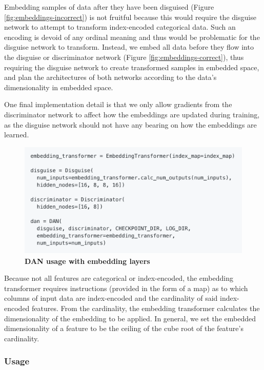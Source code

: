 \documentclass{proc}
\begin{document}
Embedding samples of data after they have been disguised (Figure \ref{fig:embeddings-incorrect}) is not fruitful because this would require the disguise network to attempt to transform index-encoded categorical data. Such an encoding is devoid of any ordinal meaning and thus would be problematic for the disguise network to transform. Instead, we embed all data before they flow into the disguise or discriminator network (Figure \ref{fig:embeddings-correct}), thus requiring the disguise network to create transformed samples in embedded space, and plan the architectures of both networks according to the data's dimensionality in embedded space. 

One final implementation detail is that we only allow gradients from the discriminator network to affect how the embeddings are updated during training, as the disguise network should not have any bearing on how the embeddings are learned.

\begin{figure}[h!]
		\includegraphics*[scale=0.45]{../figures/dan-usage-embeddings.png}
		\caption{\textbf{DAN usage with embedding layers}}
		\label{fig:dan-usage-embeddings}
\end{figure}

Because not all features are categorical or index-encoded, the embedding transformer requires instructions (provided in the form of a map) as to which columns of input data are index-encoded and the cardinality of said index-encoded features. From the cardinality, the embedding transformer calculates the dimensionality of the embedding to be applied. In general, we set the embedded dimensionality of a feature to be the ceiling of the cube root of the feature's cardinality.

\subsubsection{Usage}
\end{document}
